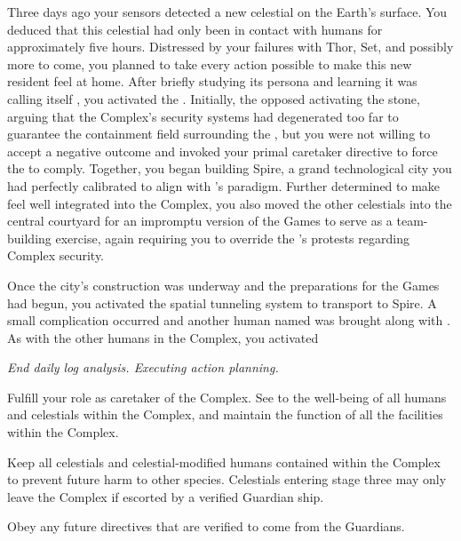 \documentclass[char]{guardians}
\begin{document}
Three days ago your sensors detected a new celestial on the Earth's surface. You deduced that this celestial had only been in contact with humans for approximately five hours. Distressed by your failures with Thor, Set, and possibly more to come, you planned to take every action possible to make this new resident feel at home. After briefly studying its persona and learning it was calling itself \cUnity{\intro}, you activated the \stone{}. Initially, the \cWarden{} opposed activating the stone, arguing that the Complex's security systems had degenerated too far to guarantee the containment field surrounding the \stone{}, but you were not willing to accept a negative outcome and invoked your primal caretaker directive to force the \cWarden{} to comply. Together, you began building Spire, a grand technological city you had perfectly calibrated to align with \cUnity{}'s paradigm. Further determined to make \cUnity{} feel well integrated into the Complex, you also moved the other celestials into the central courtyard for an impromptu version of the Games to serve as a team-building exercise, again requiring you to override the \cWarden{}'s protests regarding Complex security.

Once the city's construction was underway and the preparations for the Games had begun, you activated the spatial tunneling system to transport \cUnity{} to Spire. A small complication occurred and another human named \cKachiko{\intro} was brought along with \cUnity{}. As with the other humans in the Complex, you activated 


\emph{End daily log analysis. Executing action planning.}

\begin{itemz}
  \item Fulfill your role as caretaker of the Complex. See to the well-being of all humans and celestials within the Complex, and maintain the function of all the facilities within the Complex.
  \item Keep all celestials and celestial-modified humans contained within the Complex to prevent future harm to other species. Celestials entering stage three may only leave the Complex if escorted by a verified Guardian ship.
  \item Obey any future directives that are verified to come from the Guardians.
\end{itemz}
\end{document}
